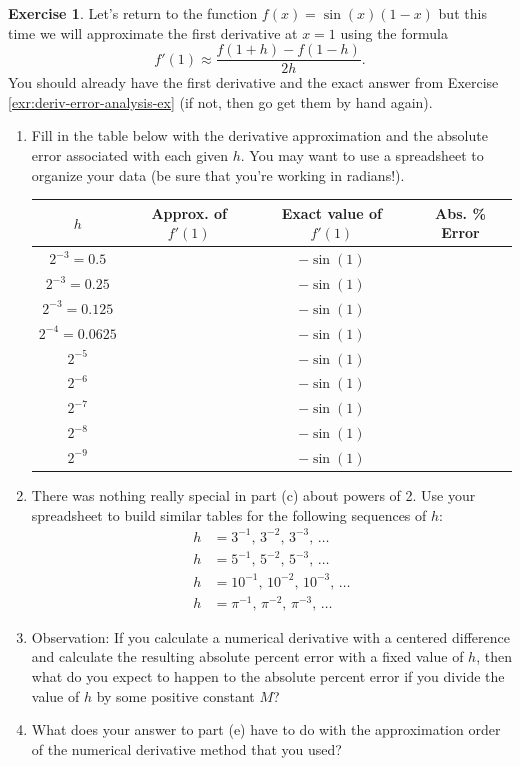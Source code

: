 \documentclass[
]{book}
\theoremstyle{definition}
\theoremstyle{definition}
\theoremstyle{definition}
\newtheorem{exercise}{Exercise}[chapter]
\theoremstyle{remark}
\begin{document}
\begin{exercise}
\protect\hypertarget{exr:unnamed-chunk-161}{}{\label{exr:unnamed-chunk-161} }Let's return to the function \(f(x) = \sin(x)(1- x)\) but this time we
will approximate the first derivative at \(x=1\) using the formula
\[f'(1) \approx \frac{f(1+h) - f(1-h)}{2h}.\] You should already have
the first derivative and the exact answer from Exercise \ref{exr:deriv-error-analysis-ex} (if not, then go get them by hand again).

\begin{enumerate}
\def\labelenumi{\alph{enumi}.}
\item
  Fill in the table below with the derivative approximation and the
  absolute error associated with each given \(h\). You may want to use a
  spreadsheet to organize your data (be sure that you're working in
  radians!).

  \begin{longtable}[]{@{}cccc@{}}
  \toprule
  \(h\) & Approx. of \(f'(1)\) & Exact value of \(f'(1)\) & Abs. \% Error\tabularnewline
  \midrule
  \endhead
  \(2^{-3} = 0.5\) & & \(-\sin(1)\) &\tabularnewline
  \(2^{-3} = 0.25\) & & \(-\sin(1)\) &\tabularnewline
  \(2^{-3} = 0.125\) & & \(-\sin(1)\) &\tabularnewline
  \(2^{-4}=0.0625\) & & \(-\sin(1)\) &\tabularnewline
  \(2^{-5}\) & & \(-\sin(1)\) &\tabularnewline
  \(2^{-6}\) & & \(-\sin(1)\) &\tabularnewline
  \(2^{-7}\) & & \(-\sin(1)\) &\tabularnewline
  \(2^{-8}\) & & \(-\sin(1)\) &\tabularnewline
  \(2^{-9}\) & & \(-\sin(1)\) &\tabularnewline
  \bottomrule
  \end{longtable}
\item
  There was nothing really special in part (c) about powers of 2. Use
  your spreadsheet to build similar tables for the following sequences
  of \(h\): \[\begin{aligned}
             h &= 3^{-1}, \, 3^{-2}, \, 3^{-3}, \, \ldots \\
             h &= 5^{-1}, \, 5^{-2}, \, 5^{-3}, \, \ldots \\
             h &= 10^{-1}, \, 10^{-2}, \, 10^{-3}, \, \ldots \\
             h &= \pi^{-1}, \, \pi^{-2}, \, \pi^{-3}, \, \ldots 
          \end{aligned}\]
\item
  Observation: If you calculate a numerical derivative with a centered
  difference and calculate the resulting absolute percent error with a
  fixed value of \(h\), then what do you expect to happen to the
  absolute percent error if you divide the value of \(h\) by some
  positive constant \(M\)?
\item
  What does your answer to part (e) have to do with the approximation
  order of the numerical derivative method that you used?
\end{enumerate}
\end{exercise}
\end{document}
